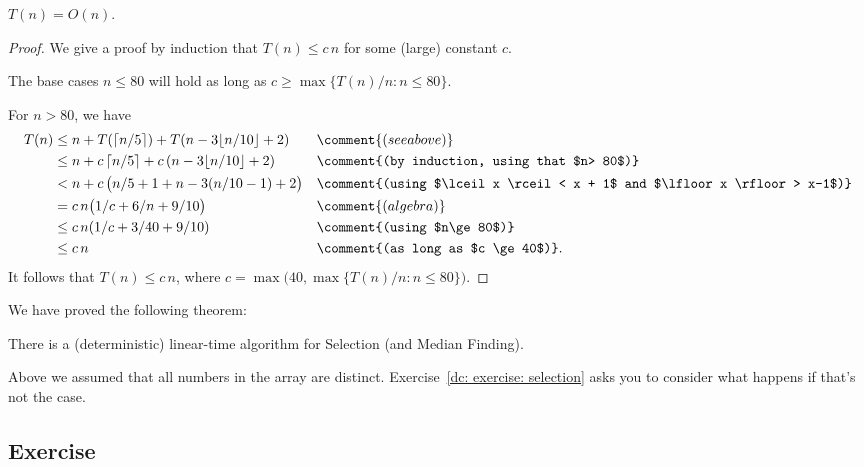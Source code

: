\begin{lemma}\label{dc: lemma: selection linear time}
  $T(n) = O(n)$.
\end{lemma}
\begin{proof}
  We give a proof by induction that $T(n) \le c\, n$ for some (large) constant $c$.

  The base cases $n\le 80$ will hold as long as $c \ge \max\{ T(n)/n : n \le 80\}$.

  For $n> 80$, we have
  \begin{align*}
    T(n)
    & \le n + T(\lceil n/5\rceil) + T(n-3\lfloor n/10 \rfloor + 2)
    &&\comment{(see above)}
    \\
    & \le n + c\, \lceil n/5\rceil + c\, (n-3\lfloor n/10 \rfloor + 2)
    &&\comment{(by induction, using that $n> 80$)}
    \\
    & < n + c\, \big( n/5 + 1 + n-3( n/10 - 1) + 2\big)
    &&\comment{(using $\lceil x \rceil < x + 1$ and $\lfloor x \rfloor > x-1$)}
    \\
    & = c\,n\big(1/c + 6/n + 9/10\big)
    &&\comment{(algebra)}
    \\
    & \le c\,n(1/c + 3/40 + 9/10)
    &&\comment{(using $n\ge 80$)}
    \\
    & \le c\,n
    &&\comment{(as long as $c \ge 40$)}.
  \end{align*}
  It follows that $T(n) \le c\,n$,
  where $c = \max\big(40, \max\{ T(n)/n : n \le 80\}\big)$.
\end{proof}

We have proved the following theorem:
\begin{theorem}
  There is a (deterministic) linear-time algorithm for Selection (and Median Finding).
\end{theorem}

Above we assumed that all numbers in the array are distinct.
Exercise~\ref{dc: exercise: selection} asks you to consider what happens if that's not the case.


\subsection{Exercise}

